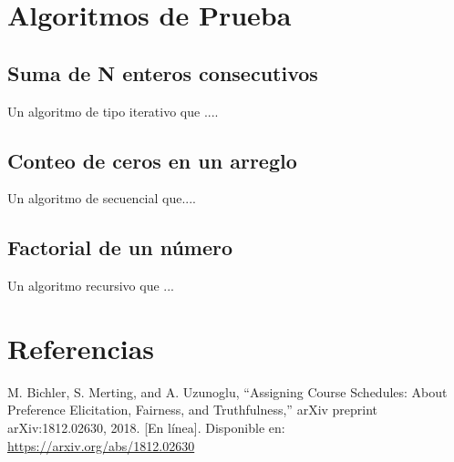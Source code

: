\documentclass{article}
\begin{document}

\section{Algoritmos de Prueba}

\subsection{Suma de N enteros consecutivos}

Un algoritmo de tipo iterativo que ....

\subsection{Conteo de ceros en un arreglo}

Un algoritmo de secuencial que....

\subsection{Factorial de un número}

Un algoritmo recursivo que ...



\section{Referencias}
\renewcommand{\refname}{}

\begin{thebibliography}{9}

   \label{ref:BPS} M. Bichler, S. Merting, and A. Uzunoglu,
  “Assigning Course Schedules: About Preference Elicitation, Fairness, and Truthfulness,”
  arXiv preprint arXiv:1812.02630, 2018. [En línea]. Disponible en:
  \url{https://arxiv.org/abs/1812.02630}


\end{thebibliography}
\end{document}
